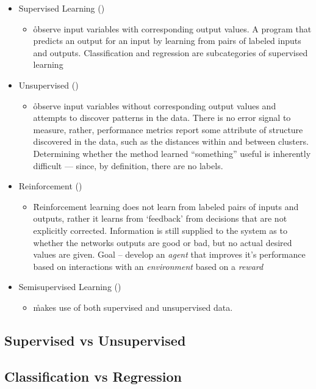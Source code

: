 \begin{itemize}[noitemsep,topsep=0pt]
	\item Supervised Learning (\ALR)
	\begin{itemize}[noitemsep,topsep=0pt]
		\item \r{observe input variables with corresponding output values. A program that predicts an output for an input by learning from pairs of labeled inputs and outputs. Classification \ALR and regression \ALR are subcategories of supervised learning}
	\end{itemize}
	\item Unsupervised (\ALR)
	\begin{itemize}[noitemsep,topsep=0pt]
		\item \r{observe input variables without corresponding output values and attempts to discover patterns in the data. There is no error signal to measure, rather, performance metrics report some attribute of structure discovered in the data, such as the distances within and between clusters. Determining whether the method learned ``something'' useful is inherently difficult --- since, by definition, there are no labels.}
	\end{itemize}
	\item{Reinforcement (\ALR)}
	\begin{itemize}[noitemsep,topsep=0pt]
		\item \r{Reinforcement learning does not learn from labeled pairs of inputs and outputs, rather it learns from `feedback' from decisions that are not explicitly corrected. Information is still supplied to the system as to whether the networks outputs are good or bad, but no actual desired values are given. Goal -- develop an \emph{agent} that improves it's performance based on interactions with an \emph{environment} based on a \emph{reward}}
	\end{itemize}
	\item Semisupervised Learning (\ALR)
	\begin{itemize}[noitemsep,topsep=0pt]
		\item \r{makes use of both supervised and unsupervised data.}
	\end{itemize}
\end{itemize}


\subsection{Supervised vs Unsupervised}

\subsection{Classification vs Regression}

